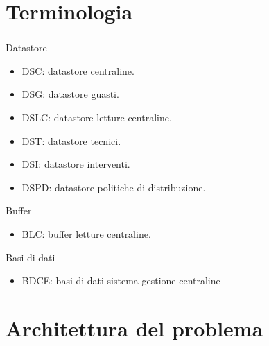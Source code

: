 \documentclass{beamer}
\begin{document}
	\section{Terminologia}\label{terminology}
	
	\begin{frame}
		\frametitle{}
		\begin{block}{Datastore}
			\begin{itemize}
				\item DSC: datastore centraline.
				\item DSG: datastore guasti.
				\item DSLC: datastore letture centraline.
				\item DST: datastore tecnici.
				\item DSI: datastore interventi.
				\item DSPD: datastore politiche di distribuzione.
			\end{itemize}
		\end{block}
		\begin{block}{Buffer}
			\begin{itemize}
				\item BLC: buffer letture centraline.
			\end{itemize}
		\end{block}
		\begin{block}{Basi di dati}
			\begin{itemize}
				\item BDCE: basi di dati sistema gestione centraline
			\end{itemize}
		\end{block}
	\end{frame}

	\section{Architettura del problema}\label{arch_problema}
	
	
\end{document}
